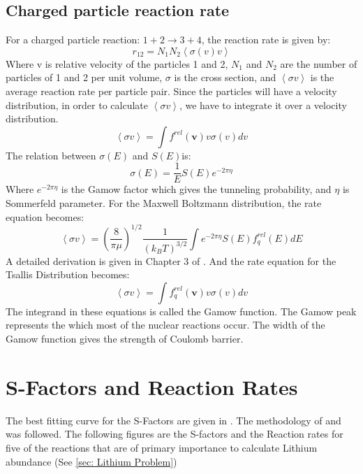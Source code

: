 \documentclass[11pt]{article}
\numberwithin{equation}{section}
\begin{document}
\subsection{Charged particle reaction rate}
For a charged particle reaction: $1+2\rightarrow3+4$, the reaction rate is given by:
$$r_{12}=N_{1}N_{2}\left< \sigma(v) v\right>$$
Where v is relative velocity of the particles 1 and 2, $N_{1}$ and $N_{2}$ are the number of particles of 1 and 2 per unit volume, $\sigma$ is the cross section, and $\left< \sigma v\right>$ is the average reaction rate per particle pair.
Since the particles will have a velocity distribution, in order to calculate $\left< \sigma v\right>$, we have to
integrate it over a velocity distribution.
$$\left< \sigma v\right>=\int f^{rel}(\boldsymbol{v})v\sigma(v)dv$$
The relation between $\sigma(E)$ and $S(E)$is:
\begin{equation}
	\sigma(E)=\frac{1}{E}S(E)e^{-2\pi\eta}
\end{equation}
Where $e^{-2\pi\eta}$ is the Gamow factor which gives the tunneling probability, and $\eta$ is Sommerfeld parameter.
For the Maxwell Boltzmann distribution, the rate equation becomes:
\begin{equation}
	\left< \sigma v\right>= \left( \frac{8}{\pi\mu} \right)^{1/2}\frac{1}{(k_{B}T)^{3/2}} \int e^{-2\pi\eta} S(E) f^{rel}_{q}(E)dE
\end{equation}
A detailed derivation is given in Chapter 3 of \cite{iliadis2015nuclear}. And the rate equation for the Tsallis Distribution becomes:
\begin{equation}
	\left< \sigma v\right>= \int f^{rel}_{q}(\boldsymbol{v})v\sigma(v)dv
\end{equation}
The integrand in these equations is called the Gamow function. The Gamow peak represents the which most of the nuclear reactions occur. The width of the Gamow function gives the strength of Coulomb barrier.

\section{S-Factors and Reaction Rates}
The best fitting curve for the S-Factors are given in \cite{Serpico_2004}. The methodology of \cite{article} and \citep{Hou_2017} was followed. The following figures are the S-factors and the Reaction rates for five of the reactions that are of primary importance to calculate Lithium abundance (See \autoref{sec: Lithium Problem})
\end{document}
